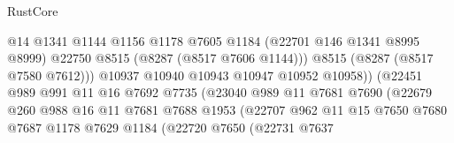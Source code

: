 \begin{lexlean}{RustCore}
\begin{coremodule}
                                            @14
                                            @1341
                                            @1144
                                            @1156
                                            @1178
                                            @7605
                                            @1184
                                            (@22701 @146 @1341 @8995 @8999)
                                            @22750
                                            @8515
                                            (@8287 (@8517 @7606 @1144)))
                                          @8515
                                          (@8287 (@8517 @7580 @7612)))
                                        @10937
                                        @10940
                                        @10943
                                        @10947
                                        @10952
                                        @10958))
                                    (@22451
                                      @989
                                      @991
                                      @11
                                      @16
                                      @7692
                                      @7735
                                      (@23040
                                        @989
                                        @11
                                        @7681
                                        @7690
                                        (@22679
                                          @260
                                          @988
                                          @16
                                          @11
                                          @7681
                                          @7688
                                          @1953
                                          (@22707
                                            @962
                                            @11
                                            @15
                                            @7650
                                            @7680
                                            @7687
                                            @1178
                                            @7629
                                            @1184
                                            (@22720
                                              @7650
                                              (@22731
                                                @7637

\end{coremodule}
\end{lexlean}
